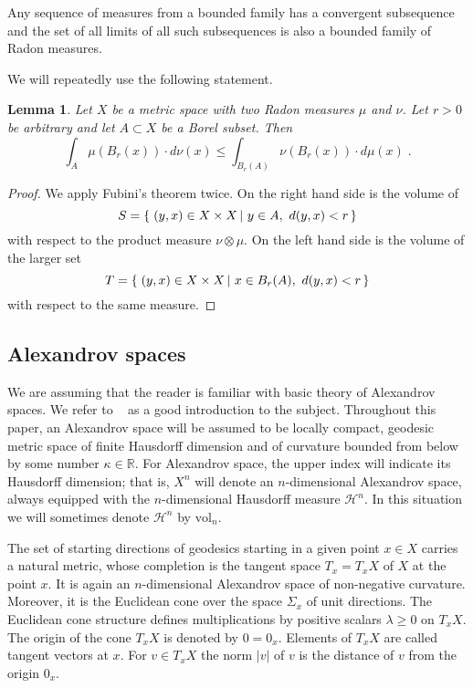 \documentclass[12pt,leqno,intlimits]{amsart}
\numberwithin{equation}{section}
\newtheorem{lem}[thm]{Lemma}
\theoremstyle{definition}
\theoremstyle{remark}
\newcommand{\vol}{\mathrm{vol}}
\newcommand{\R}{\mathbb{R}}
\newcommand*{\set}[2]{\left\{\,\left.{#1}\vphantom{#2}\,\right|\,{#2}\,\right\}}
\begin{document}
Any sequence of measures from a bounded family has a convergent
subsequence and the set of all limits of all such subsequences is also a bounded family of Radon measures.

We will repeatedly use the following statement.

\begin{lem} \label{lem:exchange}
Let $X$ be a metric space with two Radon measures $\mu $ and $\nu$. Let $r>0$ be arbitrary and let  $A\subset X$ be a Borel subset. Then
 $$\int _A \mu (B_r(x)) \cdot d\nu (x) \leq \int _{B_r (A)}  \nu (B_r (x)) \cdot d\mu (x) \; .$$
\end{lem}

\begin{proof} We apply Fubini's theorem twice.
On the right hand side is the volume of  
\[S=\set{(y,x) \in X\times X}{y \in A,\  d(y,x) <r}\] 
with respect to the product measure $\nu \otimes \mu$.
On the left hand side is the volume of the larger set 
\[T=\set{(y,x) \in  X\times X}{x\in B_r(A),\  d(y,x)<r}\] 
with respect to the same measure.
\end{proof}

\subsection{Alexandrov spaces} \label{subsec:Alex}
We are assuming that the reader is familiar with basic theory of Alexandrov spaces. We refer to ~\cite{BGP} as a good introduction to the subject.
Throughout this paper, an Alexandrov space will be assumed to be 
locally compact, 
geodesic metric space 
of finite Hausdorff dimension 
and of curvature bounded from below by some
number $\kappa \in \R$.
For Alexandrov space, the upper index will indicate its  Hausdorff dimension; 
that is, $X^n$ will denote an $n$-dimensional Alexandrov space, always equipped with the $n$-dimensional Hausdorff measure $\mathcal H^n$. 
In this situation we will sometimes denote
 $\mathcal H^n$ by $\vol_n$. %

The set of starting directions of geodesics starting in a given point $x\in X$ carries a natural metric, whose completion is the tangent space $T_x=T_xX$
of $X$ at the point $x$.  
It is again an $n$-dimensional Alexandrov space of non-negative curvature. Moreover, it is the Euclidean cone
over the space $\Sigma _x$ of unit directions. The Euclidean cone structure defines multiplications by positive scalars $\lambda \geq 0$ on $T_xX$. The origin
of the cone $T_xX$ is denoted by $0=0_x$. Elements of $T_xX$ are called tangent vectors at $x$. For $v\in T_xX$ the norm $|v|$ of $v$ is the distance of $v$ from the origin $0_x$.
\end{document}
